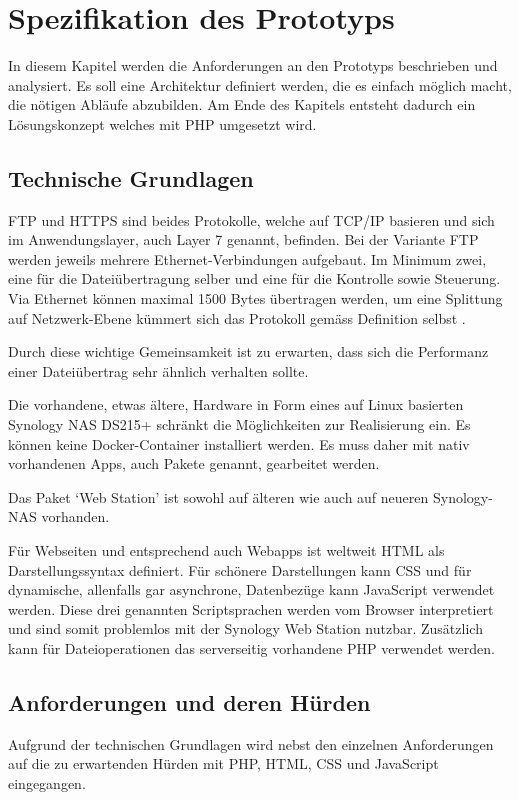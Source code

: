 \chapter{Spezifikation des Prototyps}
In diesem Kapitel werden die Anforderungen an den Prototyps beschrieben und analysiert. 
Es soll eine Architektur definiert werden, die es einfach möglich macht, die nötigen Abläufe abzubilden. 
Am Ende des Kapitels entsteht dadurch ein Lösungskonzept welches mit PHP umgesetzt wird.

\section{Technische Grundlagen}
FTP und HTTPS sind beides Protokolle, welche auf TCP/IP basieren und sich im Anwendungslayer, auch Layer 7 genannt, befinden. \cite[p.~26]{Zisler}  
Bei der Variante FTP werden jeweils mehrere Ethernet-Verbindungen aufgebaut. Im Minimum zwei, eine für die Dateiübertragung selber und eine für die Kontrolle sowie Steuerung.
Via Ethernet können maximal 1500 Bytes übertragen werden, um eine Splittung auf Netzwerk-Ebene kümmert sich das Protokoll gemäss Definition selbst \cite{Zisler}.

Durch diese wichtige Gemeinsamkeit ist zu erwarten, dass sich die Performanz einer Dateiübertrag sehr ähnlich verhalten sollte.

Die vorhandene, etwas ältere, Hardware in Form eines auf Linux basierten Synology NAS DS215+ schränkt die Möglichkeiten zur Realisierung ein. 
Es können keine Docker-Container installiert werden. Es muss daher mit nativ vorhandenen Apps, auch Pakete genannt, gearbeitet werden.  

Das Paket `Web Station' ist sowohl auf älteren wie auch auf neueren Synology-NAS vorhanden. \cite{SynologyWS} 

Für Webseiten und entsprechend auch Webapps ist weltweit HTML als Darstellungssyntax definiert. 
Für schönere Darstellungen kann CSS und für dynamische, allenfalls gar asynchrone, Datenbezüge kann JavaScript verwendet werden. \cite[p.~174]{Butz} 
Diese drei genannten Scriptsprachen werden vom Browser interpretiert und sind somit problemlos mit der Synology Web Station nutzbar.
Zusätzlich kann für Dateioperationen das serverseitig vorhandene PHP \cite{SynologyWS} verwendet werden.

\section{Anforderungen und deren Hürden}
Aufgrund der technischen Grundlagen wird nebst den einzelnen Anforderungen auf die zu erwartenden Hürden mit PHP, HTML, CSS und JavaScript eingegangen.

